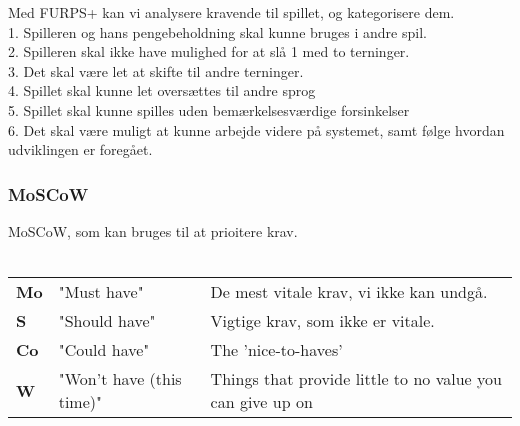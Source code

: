 Med FURPS+ kan vi analysere kravende til spillet, og kategorisere dem. \\

1. Spilleren og hans pengebeholdning skal kunne bruges i andre spil. \\

2. Spilleren skal ikke have mulighed for at slå 1 med to terninger. \\

3. Det skal være let at skifte til andre terninger. \\

4. Spillet skal kunne let oversættes til andre sprog \\

5. Spillet skal kunne spilles uden bemærkelsesværdige forsinkelser \\

6. Det skal være muligt at kunne arbejde videre på systemet, samt følge hvordan udviklingen er foregået. \\

\subsubsection{MoSCoW}
MoSCoW, som kan bruges til at prioitere krav. \\\\
\begin{tabular}{lll}
    \textbf{Mo} &   
    "Must have"                 &
    De mest vitale krav, vi ikke kan undgå. \\

    \textbf{S}  &   
    "Should have"               & 
    Vigtige krav, som ikke er vitale. \\

    \textbf{Co} &   
    "Could have"                & 
    The 'nice-to-haves' \\

    \textbf{W}  &   
    "Won’t have (this time)"    & 
    Things that provide little to no value you can give up on \\
    
\end{tabular}
\\